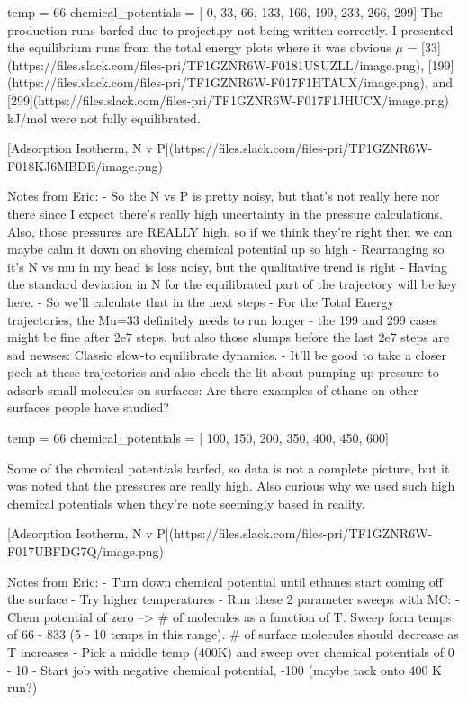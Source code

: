 temp = 66
chemical_potentials = [ 0, 33, 66, 133, 166, 199, 233, 266, 299]
The production runs barfed due to project.py not being written correctly. I presented the equilibrium runs from the total energy plots where it was obvious $\mu$ = 
[33](https://files.slack.com/files-pri/TF1GZNR6W-F0181USUZLL/image.png), 
[199](https://files.slack.com/files-pri/TF1GZNR6W-F017F1HTAUX/image.png), and 
[299](https://files.slack.com/files-pri/TF1GZNR6W-F017F1JHUCX/image.png) kJ/mol were not fully equilibrated. 

[Adsorption Isotherm, N v P](https://files.slack.com/files-pri/TF1GZNR6W-F018KJ6MBDE/image.png)

Notes from Eric:
 - So the N vs P is pretty noisy, but that's not really here nor there since I expect there's really high uncertainty in the pressure calculations. Also, those pressures are REALLY high, so if we think they're right then we can maybe calm it down on shoving chemical potential up so high
 - Rearranging so it's N vs mu in my head is less noisy, but the qualitative trend is right
 - Having the standard deviation in N for the equilibrated part of the trajectory will be key here.
 - So we'll calculate that in the next steps
 - For the Total Energy trajectories, the Mu=33 definitely needs to run longer
 - the 199 and 299 cases might be fine after 2e7 steps, but also those slumps before the last 2e7 steps are sad newses: Classic slow-to equilibrate dynamics.
 - It'll be good to take a closer peek at these trajectories and also check the lit  about pumping up pressure to adsorb small molecules on surfaces: Are there examples of ethane on other surfaces people have studied?

temp = 66
chemical_potentials = [ 100, 150, 200, 350, 400, 450, 600] 

Some of the chemical potentials barfed, so data is not a complete picture, but it was noted that the pressures are really high. Also curious why we used such high chemical potentials when they're note seemingly based in reality.

[Adsorption Isotherm, N v P](https://files.slack.com/files-pri/TF1GZNR6W-F017UBFDG7Q/image.png)

Notes from Eric:
 - Turn down chemical potential until ethanes start coming off the surface
 - Try higher temperatures
 - Run these 2 parameter sweeps with MC:
 - Chem potential of zero --> # of molecules as a function of T. Sweep form temps of 66 - 833 (5 - 10 temps in this range). # of surface molecules should decrease as T increases
 - Pick a middle temp (400K) and sweep over chemical potentials of 0 - 10
 - Start job with negative chemical potential, -100 (maybe tack onto 400 K run?)

